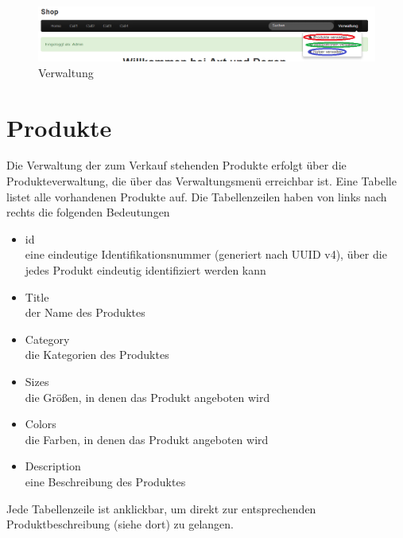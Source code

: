 \begin{figure}[h!]
  \centering
  \includegraphics[width=\textwidth]{UserManual/Verwaltung.png}
  \caption{Verwaltung}
  \label{fig:Verwaltung}
\end{figure}


\section{Produkte}
Die Verwaltung der zum Verkauf stehenden Produkte erfolgt über die Produkteverwaltung, die über das Verwaltungsmenü erreichbar ist.  Eine Tabelle listet alle vorhandenen Produkte auf. Die Tabellenzeilen haben von links nach rechts die folgenden Bedeutungen
\begin{itemize}
  \item id \\
        eine eindeutige Identifikationsnummer (generiert nach UUID v4), über die jedes Produkt eindeutig identifiziert werden kann
  \vspace*{-0.5em}
  \item Title \\
        der Name des Produktes
  \vspace*{-0.5em}
  \item Category \\
        die Kategorien des Produktes
  \vspace*{-0.5em}
  \item Sizes \\
        die Größen, in denen das Produkt angeboten wird
  \vspace*{-0.5em}
  \item Colors \\
        die Farben, in denen das Produkt angeboten wird
  \vspace*{-0.5em}
  \item Description \\
        eine Beschreibung des Produktes
\end{itemize}
Jede Tabellenzeile ist anklickbar, um direkt zur entsprechenden Produktbeschreibung (siehe dort) zu gelangen.

